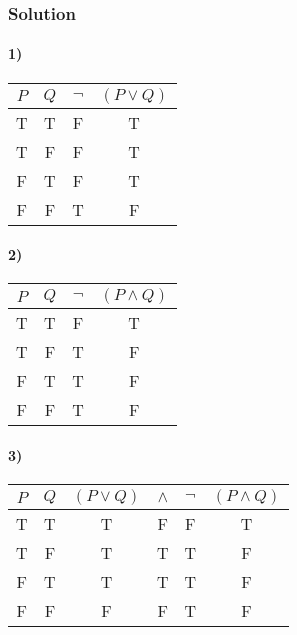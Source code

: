 \subsubsection*{Solution}

    \paragraph{1)}
    \begin{center}
    	\begin{tabular}{cc|cc}
    		$P$ & $Q$ & $\neg$ & $(P \lor Q)$ \\
    		\hline
    		T & T & \color{red}F & T\\
    		T & F & \color{red}F & T\\
    		F & T & \color{red}F & T\\
    		F & F & \color{red}T & F\\
    	\end{tabular}
    \end{center}
    
    \paragraph{2)}
    \begin{center}
    	\begin{tabular}{cc|cc}
    		$P$ & $Q$ & $\neg$ & $(P \land Q)$ \\
    		\hline
    		T & T & \color{red}F & T\\
    		T & F & \color{red}T & F\\
    		F & T & \color{red}T & F\\
    		F & F & \color{red}T & F\\
    	\end{tabular}
    \end{center}
    
    \paragraph{3)}
    \begin{center}
    	\begin{tabular}{cc|cccc}
    		$P$ & $Q$ & $(P \lor Q) $ & $\land$ & $\neg$ & $(P \land Q)$ \\
    		\hline
    		T & T & T & \color{red}F & F & T\\
    		T & F & T & \color{red}T & T & F\\
    		F & T & T & \color{red}T & T & F\\
    		F & F & F & \color{red}F & T & F\\
    	\end{tabular}
    \end{center}
    
